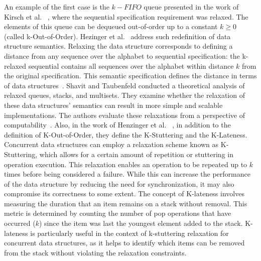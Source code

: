 An example of the first case is the \(k-FIFO\) queue presented in the work of Kirsch et al. ~\cite{DBLP_conf_pact_KirschLP13, DBLP_conf_ica3pp_KirschPRS12}, where the sequential specification requirement was relaxed. The elements of this queue can be dequeued out-of-order up to a constant \(k \ge 0\) (called k-Out-of-Order). Hezinger et al.~\cite{DBLP_conf_popl_HenzingerKPSS13} address such redefinition of data structure semantics. Relaxing the data structure corresponds to defining a distance from any sequence over the alphabet to sequential specification: the k-relaxed sequential contains all sequences over the alphabet within distance \(k\) from the original specification. This semantic specification defines the distance in terms of data structures~\cite{DBLP_conf_popl_HenzingerKPSS13}. Shavit and Taubenfeld conducted a theoretical analysis of relaxed queues, stacks, and multisets. They examine whether the relaxation of these data structures' semantics can result in more simple and scalable implementations. The authors evaluate these relaxations from a perspective of computability~\cite{DBLP_journals_dc_ShavitT16}. Also, in the work of Henzinger et al. ~\cite{DBLP_conf_popl_HenzingerKPSS13}, in addition to the definition of K-Out-of-Order, they define the K-Stuttering and the K-Lateness. Concurrent data structures can employ a relaxation scheme known as K-Stuttering, which allows for a certain amount of repetition or stuttering in operation execution. This relaxation enables an operation to be repeated up to \(k\) times before being considered a failure. While this can increase the performance of the data structure by reducing the need for synchronization, it may also compromise its correctness to some extent. The concept of K-lateness involves measuring the duration that an item remains on a stack without removal. This metric is determined by counting the number of pop operations that have occurred (\(k\)) since the item was last the youngest element added to the stack. K-lateness is particularly useful in the context of k-stuttering relaxation for concurrent data structures, as it helps to identify which items can be removed from the stack without violating the relaxation constraints.

